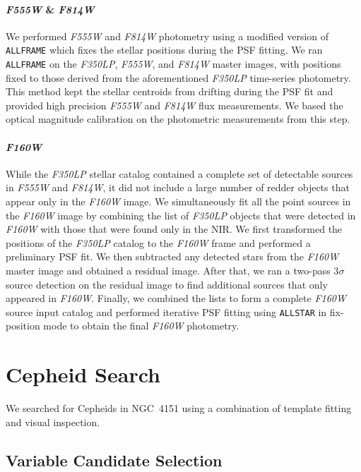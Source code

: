 \documentclass[twocolumn]{aastex63}
\renewcommand{\ng}{NGC\ 4151 }
\newcommand{\hstw}{{\it F350LP} }
\newcommand{\hstv}{{\it F555W} }
\newcommand{\hsti}{{\it F814W} }
\newcommand{\hsth}{{\it F160W} }
\newcommand{\hstws}{{\it F350LP}}
\newcommand{\hstvs}{{\it F555W}}
\newcommand{\hstis}{{\it F814W}}
\newcommand{\hsths}{{\it F160W}}
\begin{document}
\paragraph{\hstv \& \hstis} We performed \hstv and \hsti photometry using a modified version of {\tt ALLFRAME} which fixes the stellar positions during the PSF fitting. We ran {\tt ALLFRAME} on the \hstws, \hstvs, and \hsti master images, with positions fixed to those derived from the aforementioned \hstw time-series photometry. This method kept the stellar centroids from drifting during the PSF fit and provided high precision \hstv and \hsti flux measurements. We based the optical magnitude calibration on the photometric measurements from this step.

\paragraph{\hsths} While the \hstw stellar catalog contained a complete set of detectable sources in \hstv and \hstis, it did not include a large number of redder objects that appear only in the \hsth image. We simultaneously fit all the point sources in the \hsth image by combining the list of \hstw objects that were detected in \hsth with those that were found only in the NIR. We first transformed the positions of the \hstw catalog to the \hsth frame and performed a preliminary PSF fit. We then subtracted any detected stars from the \hsth master image and obtained a residual image. After that, we ran a two-pass 3$\sigma$ source detection on the residual image to find additional sources that only appeared in \hsths. Finally, we combined the lists to form a complete \hsth source input catalog and performed iterative PSF fitting using {\tt ALLSTAR} in fix-position mode to obtain the final \hsth photometry.

\section{Cepheid Search}

We searched for Cepheids in \ng using a combination of template fitting and visual inspection.

\subsection{Variable Candidate Selection}
\end{document}
